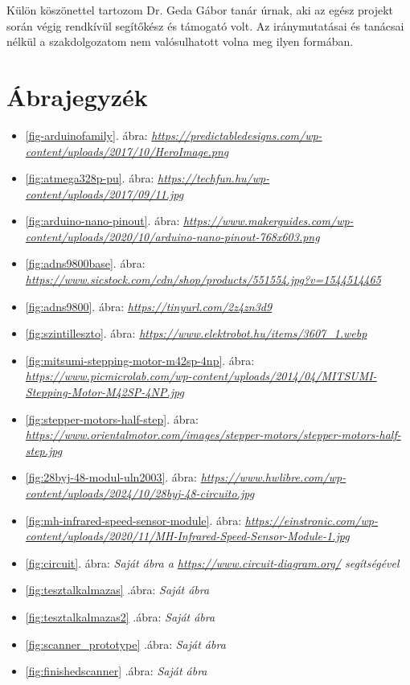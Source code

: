 \documentclass[]{thesis-ekf}
\theoremstyle{definition}
\theoremstyle{remark}
\begin{document}
Külön köszönettel tartozom Dr. Geda Gábor tanár úrnak, aki az egész projekt során végig rendkívül segítőkész és támogató volt. Az iránymutatásai és tanácsai nélkül a szakdolgozatom nem valósulhatott volna meg ilyen formában.
\chapter*{Ábrajegyzék}
\begin{itemize}
	\item \ref{fig-arduinofamily}. ábra: \emph{\url{https://predictabledesigns.com/wp-content/uploads/2017/10/HeroImage.png}}
	\item \ref{fig:atmega328p-pu}. ábra: \emph{\url{https://techfun.hu/wp-content/uploads/2017/09/11.jpg}}
	\item \ref{fig:arduino-nano-pinout}. ábra: \emph{\url{https://www.makerguides.com/wp-content/uploads/2020/10/arduino-nano-pinout-768x603.png}}
	\item \ref{fig:adns9800base}. ábra: \emph{\url{https://www.sicstock.com/cdn/shop/products/551554.jpg?v=1544514465}}
	\item \ref{fig:adns9800}. ábra: \emph{\url{https://tinyurl.com/2z4zn3d9}} 
	\item \ref{fig:szintilleszto}. ábra: \emph{\url{https://www.elektrobot.hu/items/3607_1.webp}}
	\item \ref{fig:mitsumi-stepping-motor-m42sp-4np}. ábra: \emph{\url{https://www.picmicrolab.com/wp-content/uploads/2014/04/MITSUMI-Stepping-Motor-M42SP-4NP.jpg}}
	\item \ref{fig:stepper-motors-half-step}. ábra: \emph{\url{https://www.orientalmotor.com/images/stepper-motors/stepper-motors-half-step.jpg}}
	\item \ref{fig:28byj-48-modul-uln2003}. ábra: \emph{\url{https://www.hwlibre.com/wp-content/uploads/2024/10/28byj-48-circuito.jpg}}
	\item \ref{fig:mh-infrared-speed-sensor-module}. ábra: \emph{\url{https://einstronic.com/wp-content/uploads/2020/11/MH-Infrared-Speed-Sensor-Module-1.jpg}}
	\item \ref{fig:circuit}. ábra: \emph{Saját ábra a \url{https://www.circuit-diagram.org/} segítségével}
	\item \ref{fig:tesztalkalmazas} .ábra: \emph{Saját ábra}
	\item \ref{fig:tesztalkalmazas2} .ábra: \emph{Saját ábra}
	\item \ref{fig:scanner_prototype} .ábra: \emph{Saját ábra}
	\item \ref{fig:finishedscanner} .ábra: \emph{Saját ábra}
\end{itemize}
\end{document}
